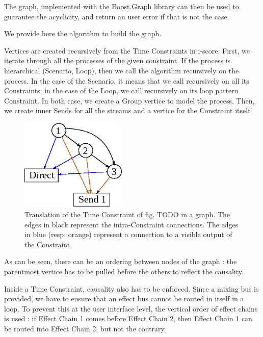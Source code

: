 \documentclass{article}
\begin{document}
The graph, implemented with the Boost.Graph library can then be used to 
guarantee the acyclicity, and return an user error if that is not the case.

We provide here the algorithm to build the graph.

Vertices are created recursively from the Time Constraints in i-score.
First, we iterate through all the processes of the given constraint.
If the process is hierarchical (Scenario, Loop), then we call the algorithm recursively on the process.
In the case of the Scenario, it means that we call recursively on all its Constraints; in the case of the Loop, we call recursively on its loop pattern Constraint.
In both case, we create a Group vertice to model the process.
Then, we create inner Sends for all the streams and a vertice for the Constraint itself.

\begin{figure}
	\includegraphics[width=0.45\textwidth]{figures/graph1.eps}
	\caption{Translation of the Time Constraint of fig. TODO in a graph.
		The edges in black represent the intra-Constraint connections. 
		The edges in blue (resp. orange) represent a connection to a visible output of 
		the Constraint.}
\end{figure}

As can be seen, there can be an ordering between nodes of the graph : the parentmost vertice
has to be pulled before the others to reflect the causality.

Inside a Time Constraint, causality also has to be enforced. 
Since a mixing bus is provided, we have to ensure that an effect bus cannot be routed in 
itself in a loop. 
To prevent this at the user interface level, the vertical order of effect chains is used : 
if Effect Chain 1 comes before Effect Chain 2, then Effect Chain 1 can be routed into Effect Chain 2, but not the contrary.
\end{document}

